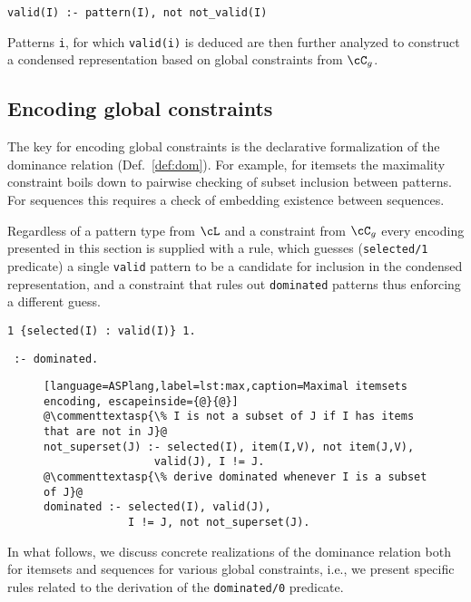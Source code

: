 \small{
\begin{center}
\texttt{valid(I) :- pattern(I), not not\_valid(I)}
\end{center}}

\normalsize{Patterns \texttt{i}, for which \texttt{valid(i)} is deduced are then further analyzed to construct a condensed representation based on global constraints from $\cC_g$.}


\subsection{Encoding global constraints}

The key for encoding global constraints is the declarative formalization of the dominance relation (Def.~\ref{def:dom}). For example, for itemsets the maximality constraint boils down to pairwise checking of subset inclusion between patterns. For sequences this requires a check of embedding existence between sequences.



 Regardless of a pattern type from $\cL$ %
and a constraint from $\cC_g$ every encoding presented 
in this section is supplied with a rule, which guesses (\texttt{selected/1} predicate) a single \texttt{valid} pattern to be a candidate for inclusion in the condensed representation, and a constraint that rules out \texttt{dominated} patterns thus enforcing a different guess. 


\small{\begin{center}
\texttt{1 \{selected(I) : valid(I)\} 1.}
\end{center}

\begin{center}
\texttt{ :- dominated.}
\end{center}}


 \begin{figure}[t]
\small{
 \begin{lstlisting}[language=ASPlang,label=lst:max,caption=Maximal itemsets encoding, escapeinside={@}{@}]
@\commenttextasp{\% I is not a subset of J if I has items that are not in J}@
not_superset(J) :- selected(I), item(I,V), not item(J,V), 
                 valid(J), I != J.
@\commenttextasp{\% derive dominated whenever I is a subset of J}@
dominated :- selected(I), valid(J), 
             I != J, not not_superset(J).
\end{lstlisting}}
 \end{figure}
 \normalsize{In what follows, we discuss concrete realizations of the dominance relation both for itemsets and sequences for various global constraints, i.e., we present specific rules related to the derivation of the \texttt{dominated/0} predicate.
}


